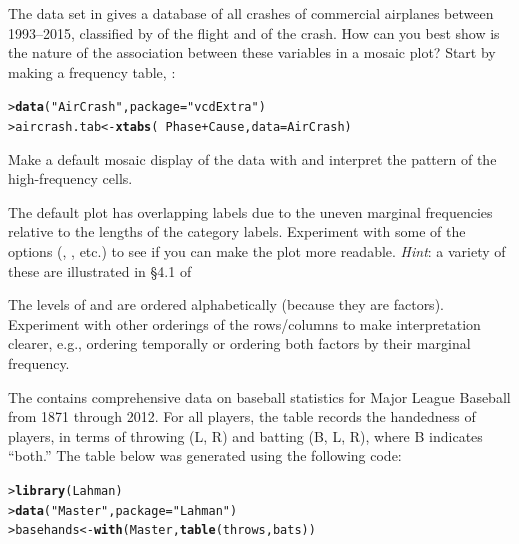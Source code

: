 \documentclass[11pt]{report}\usepackage[]{graphicx}\usepackage[]{color}
\makeatletter
\newcommand{\hlstr}[1]{\textcolor[rgb]{0.192,0.494,0.8}{#1}}%
\newcommand{\hlopt}[1]{\textcolor[rgb]{0,0,0}{#1}}%
\newcommand{\hlstd}[1]{\textcolor[rgb]{0.345,0.345,0.345}{#1}}%
\newcommand{\hlkwb}[1]{\textcolor[rgb]{0.69,0.353,0.396}{#1}}%
\newcommand{\hlkwc}[1]{\textcolor[rgb]{0.333,0.667,0.333}{#1}}%
\newcommand{\hlkwd}[1]{\textcolor[rgb]{0.737,0.353,0.396}{\textbf{#1}}}%
\newenvironment{kframe}{%
 \def\at@end@of@kframe{}%
 \ifinner\ifhmode%
  \def\at@end@of@kframe{\end{minipage}}%
  \begin{minipage}{\columnwidth}%
 \fi\fi%
 \def\FrameCommand##1{\hskip\@totalleftmargin \hskip-\fboxsep
 \colorbox{shadecolor}{##1}\hskip-\fboxsep
     \hskip-\linewidth \hskip-\@totalleftmargin \hskip\columnwidth}%
 \MakeFramed {\advance\hsize-\width
   \@totalleftmargin\z@ \linewidth\hsize
   \@setminipage}}%
 {\par\unskip\endMakeFramed%
 \at@end@of@kframe}
\newenvironment{knitrout}{}{} %
\renewenvironment{knitrout}{\small\renewcommand{\baselinestretch}{.85}}{} %
\makeatother
\begin{document}
\begin{Exercises}
\exercise\label{lab:mosaic-crash} The data set  in  gives a database of all crashes of commercial airplanes
between 1993--2015, classified by  of the flight and  of the crash.  How can you best show is the nature of the
association between these variables in a mosaic plot?  Start by making a frequency table, :
\begin{knitrout}
\color{fgcolor}\begin{kframe}
\begin{alltt}
\hlstd{> }\hlkwd{data}\hlstd{(}\hlstr{"AirCrash"}\hlstd{,} \hlkwc{package} \hlstd{=} \hlstr{"vcdExtra"}\hlstd{)}
\hlstd{> }\hlstd{aircrash.tab} \hlkwb{<-} \hlkwd{xtabs}\hlstd{(}\hlopt{~} \hlstd{Phase} \hlopt{+} \hlstd{Cause,} \hlkwc{data} \hlstd{= AirCrash)}
\end{alltt}
\end{kframe}
\end{knitrout}
  \begin{enumerate*}
    \item Make a default mosaic display of the data with  and interpret the pattern of the high-frequency cells.
    \item The default plot has overlapping labels due to the uneven marginal frequencies relative to the lengths of the category
    labels.  Experiment with some of the  options (, , etc.)
    to see if you can make the plot more readable. \emph{Hint}: a variety of these are illustrated in \S 4.1 of 
    \item The levels of  and  are ordered alphabetically (because they are factors).  Experiment with 
    other orderings of the rows/columns to make interpretation clearer, e.g., ordering  temporally or ordering
    both factors by their marginal frequency.
  \end{enumerate*}

\exercise The  contains comprehensive data on baseball statistics for Major League Baseball from 1871 through 2012.  
For all players, the  table records the handedness of players, in terms of
throwing (L, R) and batting (B, L, R), where B indicates ``both.''
The table below was generated using the following code:
\begin{knitrout}
\color{fgcolor}\begin{kframe}
\begin{alltt}
\hlstd{> }\hlkwd{library}\hlstd{(Lahman)}
\hlstd{> }\hlkwd{data}\hlstd{(}\hlstr{"Master"}\hlstd{,} \hlkwc{package} \hlstd{=} \hlstr{"Lahman"}\hlstd{)}
\hlstd{> }\hlstd{basehands} \hlkwb{<-} \hlkwd{with}\hlstd{(Master,} \hlkwd{table}\hlstd{(throws, bats))}
\end{alltt}
\end{kframe}
\end{knitrout}



\end{Exercises}
\end{document}
